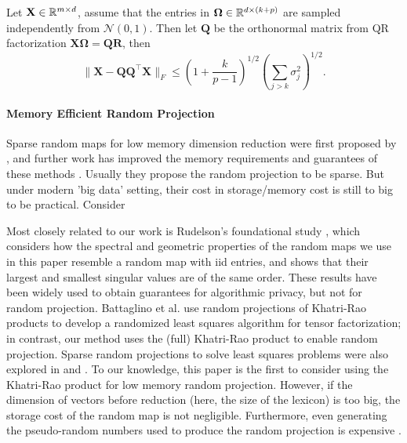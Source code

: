 \begin{lem}
	\label{lemma:gauss-rp-matrix}
	Let $\mathbf{X} \in \mathbb{R}^{m\times d}$, assume that the entries in $\mathbf{\Omega}\in \mathbb{R}^{d\times (k+p)}$ are sampled independently from $\mathcal{N}(0, 1)$. Then let  $\mathbf{Q}$  
	be the orthonormal matrix  from QR factorization $\mathbf{X\Omega} = \mathbf{QR}$, then 
	\begin{equation}
	\label{eq:gauss_col_preservation}
	 \|\mathbf{X} - \mathbf{QQ}^\top \mathbf{X}\|_F \le \left(1+\frac{k}{p-1}\right)^{1/2}\left(\sum_{j>k} \sigma_j^2\right)^{1/2}.
	\end{equation}
\end{lem}


\paragraph{Memory Efficient Random Projection}
Sparse random maps for low memory dimension reduction
were first proposed by \cite{achlioptas2003database}, 
and further work has improved the memory requirements and guarantees of these methods
\cite{li2006very, ailon2006approximate, bourgain2015toward}.  Usually they propose the random projection to be sparse.  But under modern 'big data' setting, their cost in storage/memory cost is still to big to be practical. Consider





Most closely related to our work is Rudelson's foundational study \cite{rudelson2012row},
which considers how the spectral and geometric properties of
the random maps we use in this paper resemble a random map with iid entries,
and shows that their largest and smallest singular values are of the same order.
These results have been widely used to obtain guarantees for algorithmic privacy,
but not for random projection.
Battaglino et al. \cite{battaglino2018practical} use random projections
of Khatri-Rao products to develop a randomized least squares algorithm
for tensor factorization;
in contrast, our method uses the (full) Khatri-Rao product to enable random projection.
Sparse random projections to solve least squares problems were
also explored in \cite{wang2015fast} and \cite{woodruff2014sketching}.
To our knowledge, this paper is the first to consider using the Khatri-Rao product
for low memory random projection.
However, if the dimension of vectors before reduction
(here, the size of the lexicon) is too big,
the storage cost of the random map is not negligible.
Furthermore, even generating the pseudo-random numbers used to produce the random projection
is expensive \cite{matsumoto1998mersenne}.

